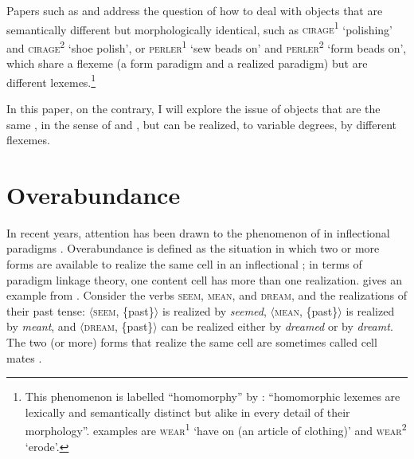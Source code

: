 \documentclass[output=paper]{langsci/langscibook}
\begin{document}
Papers such as %
\citet{Fradin17} %
%
%
and %
\citet{Bonami12t} %
%
address
the question of how to deal with objects that are semantically different
but morphologically identical, such as
\textsc{cirage\textsuperscript{1}} `polishing' and
\textsc{cirage\textsuperscript{2}} `shoe polish', or
\textsc{perler\textsuperscript{1}} `sew beads on' and
\textsc{perler\textsuperscript{2}} `form beads on', which share a
flexeme (a form paradigm and a realized paradigm) but are different
lexemes.\footnote{This phenomenon is labelled ``homomorphy'' by %
\citet[65]{Stump16}%
%
: ``homomorphic lexemes are lexically and semantically
  distinct but alike in every detail of their morphology''. 
  examples are \textsc{wear\textsuperscript{1}} `have on (an article of
  clothing)' and \textsc{wear\textsuperscript{2}} `erode'.}

In this paper, on the contrary, I will explore the issue of objects that
are the same , in the sense of %
\citet{Fradin03b} %
%
and
%
\citet{Fradin2003,Fradin17}%
%
, but can be realized, to variable degrees, by
different flexemes.

\section{Overabundance}\label{overabundance}
\largerpage
In recent years, attention has been drawn to the phenomenon of
 in inflectional paradigms %
\citep[147-151]{Thornton11,Stump16}%
%
. Overabundance is defined as the situation in which two or more
forms are available to realize the same cell in an inflectional
; in terms of paradigm linkage theory, one content cell has more
than one realization. %
\citet[148]{Stump16} %
%
gives an
example from . Consider the verbs \textsc{seem}, \textsc{mean},
and \textsc{dream}, and the realizations of their past tense:
$\langle$\textsc{seem}, \{past\}$\rangle$ is realized by \emph{seemed}, $\langle$\textsc{mean},
\{past\}$\rangle$ is realized by \emph{meant}, and $\langle$\textsc{dream}, \{past\}$\rangle$
can be realized either by \emph{dreamed} or by \emph{dreamt}. The two
(or more) forms that realize the same cell are sometimes called cell
mates %
\citep{Thornton11}%
%
.
\end{document}

